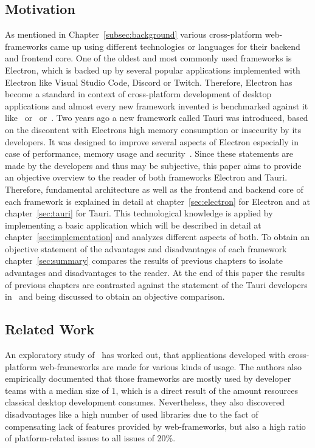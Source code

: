 \subsection{Motivation}\label{subsec:motivation}
As mentioned in Chapter~\ref{subsec:background} various cross-platform web-frameworks came up using different technologies or languages for their backend and frontend core.
One of the oldest and most commonly used frameworks is Electron, which is backed up by several popular applications implemented with Electron like Visual Studio Code, Discord or Twitch.
Therefore, Electron has become a standard in context of cross-platform development of desktop applications and almost every new framework invented is benchmarked against it like~\cite{flutter} or~\cite{electron-javafx} or~\cite{electron-nwjs}.
Two years ago a new framework called Tauri was introduced, based on the discontent with Electrons high memory consumption or insecurity by its developers.
It was designed to improve several aspects of Electron especially in case of performance, memory usage and security~\cite{tauri}.
Since these statements are made by the developers and thus may be subjective, this paper aims to provide an objective overview to the reader of both frameworks Electron and Tauri.
Therefore, fundamental architecture as well as the frontend and backend core of each framework is explained in detail at chapter~\ref{sec:electron} for Electron and at chapter~\ref{sec:tauri} for Tauri.
This technological knowledge is applied by implementing a basic application which will be described in detail at chapter~\ref{sec:implementation} and analyzes different aspects of both.
To obtain an objective statement of the advantages and disadvantages of each framework chapter~\ref{sec:summary} compares the results of previous chapters
to isolate advantages and disadvantages to the reader.
At the end of this paper the results of previous chapters are contrasted against the statement of the Tauri developers in~\cite{tauri} and being discussed to obtain an objective
comparison.

\subsection{Related Work}\label{subsec:related-work}
An exploratory study of~\cite{explorationstudy} has worked out, that applications developed with cross-platform web-frameworks are made for various kinds of usage.
The authors also empirically documented that those frameworks are mostly used by developer teams with a median size of 1, which is a direct result of the
amount resources classical desktop development consumes.
Nevertheless, they also discovered disadvantages like a high number of used libraries due to the fact of compensating lack of features provided by web-frameworks,
but also a high ratio of platform-related issues to all issues of 20\%.

